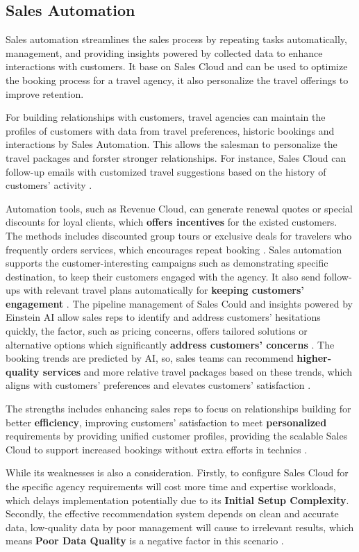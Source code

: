 \subsection{Sales Automation}
Sales automation streamlines the sales process by repeating tasks automatically, management, and providing insights powered by collected data to enhance interactions with customers. It base on Sales Cloud and can be used to optimize the booking process for a travel agency, it also personalize the travel offerings to improve retention. 

For building relationships with customers, travel agencies can maintain the profiles of customers with data from travel preferences, historic bookings and interactions by Sales Automation. This allows the salesman to personalize the travel packages and forster stronger relationships. For instance, Sales Cloud can follow-up emails with customized travel suggestions based on the history of customers' activity \cite{SalesforceSalesCloud2025}.

Automation tools, such as Revenue Cloud, can generate renewal quotes or special discounts for loyal clients, which \textbf{offers incentives} for the existed customers. The methods includes discounted group tours or exclusive deals for travelers who frequently orders services, which encourages repeat booking \cite{SalesforceRevenueCloud2024}. Sales automation supports the customer-interesting campaigns such as demonstrating specific destination, to keep their customers engaged with the agency. It also send follow-ups with relevant travel plans automatically for \textbf{keeping customers' engagement} \cite{SalesforceEinstein2025}. The pipeline management of Sales Could and insights powered by Einstein AI allow sales reps to identify and address customers' hesitations quickly, the factor, such as pricing concerns, offers tailored solutions or alternative options which significantly \textbf{address customers' concerns} \cite{SalesforceEinstein2025}. The booking trends are predicted by AI, so, sales teams can recommend \textbf{higher-quality services} and more relative travel packages based on these trends, which aligns with customers' preferences and elevates customers' satisfaction \cite{SalesforceSalesCloud2025}.

The strengths includes enhancing sales reps to focus on relationships building for better \textbf{efficiency}, improving customers' satisfaction to meet \textbf{personalized} requirements by providing unified customer profiles, providing the scalable Sales Cloud to support increased bookings without extra efforts in technics \cite{SalesforceSalesCloud2025}.

While its weaknesses is also a consideration. Firstly, to configure Sales Cloud for the specific agency requirements will cost more time and expertise workloads, which delays implementation potentially due to its \textbf{Initial Setup Complexity}. Secondly, the effective recommendation system depends on clean and accurate data, low-quality data by poor management will cause to irrelevant results, which means \textbf{Poor Data Quality} is a negative factor in this scenario \cite{SalesforceDataManagement2024}.